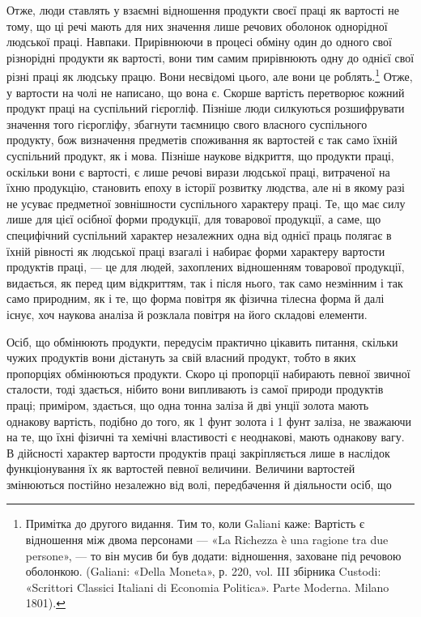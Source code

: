 Отже, люди ставлять у взаємні відношення продукти своєї
праці як вартості не тому, що ці речі мають для них значення лише
речових оболонок однорідної людської праці. Навпаки. Прирівнюючи
в процесі обміну один до одного свої різнорідні продукти
як вартості, вони тим самим прирівнюють одну до однієї свої
різні праці як людську працю. Вони несвідомі цього, але вони
це роблять.\footnote{
Примітка до другого видання. Тим то, коли Galiani каже: Вартість
є відношення між двома персонами — «La Richezza è una ragione
tra due persone», — то він мусив би був додати: відношення, заховане під
речовою оболонкою. (Galiani: «Della Moneta», р. 220, vol. III збірника
Custodi: «Scrittori Classici Italiani di Economia Politica». Parte
Moderna. Milano 1801).
} Отже, у вартости на чолі не написано, що вона є.
Скорше вартість перетворює кожний продукт праці на суспільний
гієрогліф. Пізніше люди силкуються розшифрувати значення того
гієрогліфу, збагнути таємницю свого власного суспільного продукту,
бож визначення предметів споживання як вартостей є
так само їхній суспільний продукт, як і мова. Пізніше наукове
відкриття, що продукти праці, оскільки вони є вартості, є лише
речові вирази людської праці, витраченої на їхню продукцію,
становить епоху в історії розвитку людства, але ні в якому разі
не усуває предметної зовнішности суспільного характеру праці.
Те, що має силу лише для цієї осібної форми продукції, для товарової
продукції, а саме, що специфічний суспільний характер
незалежних одна від однієї праць полягає в їхній рівності як
людської праці взагалі і набирає форми характеру вартости продуктів
праці, — це для людей, захоплених відношенням товарової
продукції, видається, як перед цим відкриттям, так і після нього,
так само незмінним і так само природним, як і те, що форма повітря
як фізична тілесна форма й далі існує, хоч наукова аналіза
й розклала повітря на його складові елементи.

Осіб, що обмінюють продукти, передусім практично цікавить
питання, скільки чужих продуктів вони дістануть за свій власний
продукт, тобто в яких пропорціях обмінюються продукти. Скоро
ці пропорції набирають певної звичної сталости, тоді здається,
нібито вони випливають із самої природи продуктів праці; приміром,
здається, що одна тонна заліза й дві унції золота мають однакову
вартість, подібно до того, як 1 фунт золота і 1 фунт заліза, не
зважаючи на те, що їхні фізичні та хемічні властивості є неоднакові,
мають однакову вагу. В дійсності характер вартости продуктів
праці закріпляється лише в наслідок функціонування їх як
вартостей певної величини. Величини вартостей змінюються постійно
незалежно від волі, передбачення й діяльности осіб, що
\parbreak{}  %
